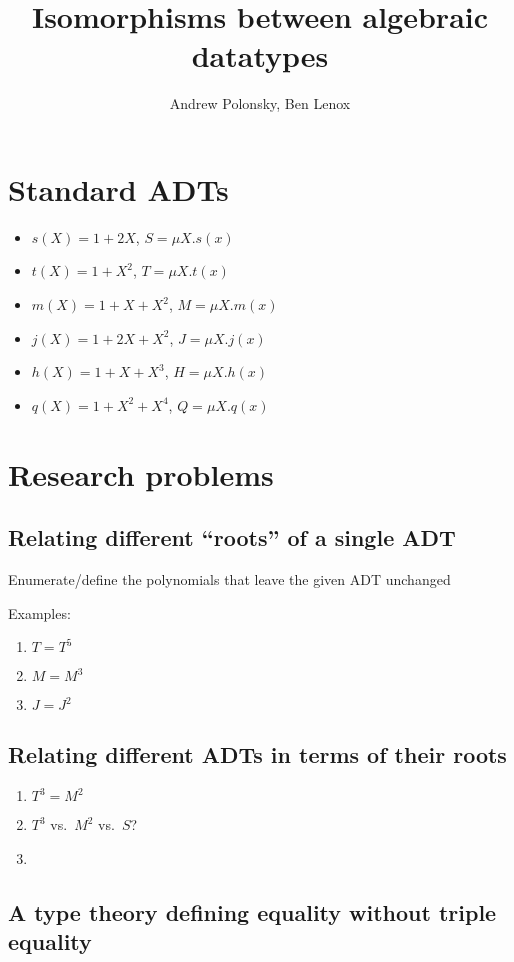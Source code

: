 \documentclass[letterpaper,numbers=enddot]{scrartcl}
\title{Isomorphisms between algebraic datatypes}
\author{Andrew Polonsky, Ben Lenox}
\begin{document}
\maketitle

\section{Standard ADTs}
\begin{itemize}
  \item $s(X) = 1 + 2X$, $S = \mu X. s(x)$
  \item $t(X) = 1 + X^2$, $T = \mu X. t(x)$
  \item $m(X) = 1 + X + X^2$, $M = \mu X. m(x)$
  \item $j(X) = 1 + 2X + X^2$, $J = \mu X. j(x)$
  \item $h(X) = 1 + X + X^3$, $H = \mu X. h(x)$
  \item $q(X) = 1 + X^2 + X^4$, $Q = \mu X. q(x)$
\end{itemize}

\section{Research problems}
\subsection{Relating different ``roots'' of a single ADT}

Enumerate/define the polynomials that leave the given ADT unchanged

Examples:
\begin{enumerate}
  \item $T = T^5$
  \item $M = M^3$
  \item $J = J^2$
\end{enumerate}

\subsection{Relating different ADTs in terms of their roots}
\begin{enumerate}
  \item $T^3 = M^2$
  \item $T^3$ vs.\ $M^2$ vs.\ $S$?
  \item
\end{enumerate}

\subsection{A type theory defining equality without triple equality}
\end{document}
